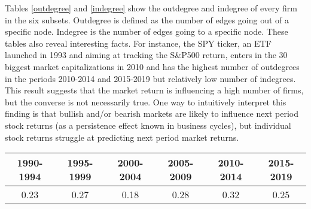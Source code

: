 Tables \ref{outdegree} and \ref{indegree} show the outdegree and indegree of every firm in the six subsets. Outdegree is defined as the number of edges going out of a specific node. Indegree is the number of edges going to a specific node.
These tables also reveal interesting facts. For instance, the SPY ticker, an ETF launched in 1993 and aiming at tracking the S\&P500 return, enters in the 30 biggest market capitalizations in 2010 and has the highest number of outdegrees in the periods 2010-2014 and 2015-2019 but relatively low number of indegrees. 
This result suggests that the market return is influencing a high number of firms, but the converse is not necessarily true. One way to intuitively interpret this finding is that bullish and/or bearish markets are likely to influence next period stock returns (as a persistence effect known in business cycles), but individual stock returns struggle at predicting next period market returns. 


\begin{table}[]
\centering
\begin{tabular}{cccccc}
\hline
\multicolumn{1}{|c|}{1990-1994} &
  \multicolumn{1}{c|}{1995-1999} &
  \multicolumn{1}{c|}{2000-2004} &
  \multicolumn{1}{c|}{2005-2009} &
  \multicolumn{1}{c|}{2010-2014} &
  \multicolumn{1}{c|}{2015-2019} \\ \hline
\multicolumn{1}{|c|}{0.23} &
  \multicolumn{1}{c|}{0.27} &
  \multicolumn{1}{c|}{0.18} &
  \multicolumn{1}{c|}{0.28} &
  \multicolumn{1}{c|}{0.32} &
  \multicolumn{1}{c|}{0.25} \\ \hline

\end{tabular}
\label{GrangerCausality}
\end{table}

    
